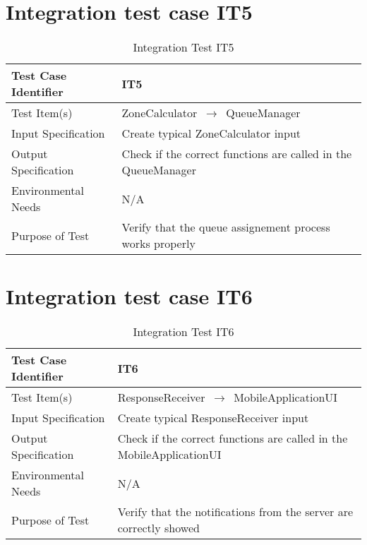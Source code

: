 \documentclass[../../testPlan.tex]{subfiles}
\begin{document}
	\section{Integration test case IT5}
		\begin{table}[H]
			\centering
			\label{IT5}
			\begin{tabular}{ll}
				\hline
				Test Case Identifier & IT5  \\ \hline
				Test Item(s)         & ZoneCalculator $\,\to\,$ QueueManager\\ \hline
				Input Specification  & Create typical ZoneCalculator input  \\ \hline
				Output Specification & Check if the correct functions are called in the QueueManager\\ \hline
				Environmental Needs  &  N/A \\ \hline
				Purpose of Test      &  Verify that the queue assignement process works properly\\ \hline
			\end{tabular}
			\caption{Integration Test IT5}
		\end{table}
		
		
	\section{Integration test case IT6}
		\begin{table}[H]
			\centering
			\label{IT6}
			\begin{tabular}{ll}
				\hline
				Test Case Identifier & IT6  \\ \hline
				Test Item(s)         & ResponseReceiver $\,\to\,$ MobileApplicationUI\\ \hline
				Input Specification  & Create typical ResponseReceiver input  \\ \hline
				Output Specification & Check if the correct functions are called in the MobileApplicationUI\\ \hline
				Environmental Needs  &  N/A \\ \hline
				Purpose of Test      & Verify that the notifications from the server are correctly showed \\ \hline
			\end{tabular}
			\caption{Integration Test IT6}
		\end{table}
		
		
		
		
		
\end{document}
